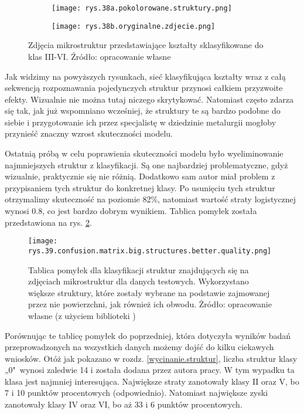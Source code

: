 \begin{figure}[h]
	\centering
	\begin{subfigure}{0.41\textwidth}
	    \centering
	    \texttt{[image: rys.38a.pokolorowane.struktury.png]}
	\end{subfigure}
	\begin{subfigure}{0.41\textwidth}
	    \centering
	    \texttt{[image: rys.38b.oryginalne.zdjecie.png]}
	\end{subfigure}
	\caption{\label{rys.38}Zdjęcia mikrostruktur przedstawiające kształty sklasyfikowane do klas III-VI. Źródło: opracowanie własne}
\end{figure}
\afterpage{\clearpage}Jak widzimy na powyższych rysunkach, sieć klasyfikująca kształty wraz z całą sekwencją rozpoznawania pojedynczych struktur przynosi całkiem przyzwoite efekty. Wizualnie nie można tutaj niczego skrytykować. Natomiast często zdarza się tak, jak już wspomniano wcześniej, że struktury te są bardzo podobne do siebie i przygotowanie ich przez specjalistę w dziedzinie metalurgii mogłoby przynieść znaczny wzrost skuteczności modelu.

Ostatnią próbą w celu poprawienia skuteczności modelu było wyeliminowanie najmniejszych struktur z klasyfikacji. Są one najbardziej problematyczne, gdyż wizualnie, praktycznie się nie różnią. Dodatkowo sam autor miał problem z przypisaniem tych struktur do konkretnej klasy. Po usunięciu tych struktur otrzymalimy skuteczność na poziomie 82\%, natomiast wartość straty logistycznej wynosi $0.8$, co jest bardzo dobrym wynikiem. Tablica pomyłek została przedstawiona na rys. \ref{rys.39.confusion.matrix.big.structures.png}. 
\begin{figure}[h]
    \centering
    \texttt{[image: rys.39.confusion.matrix.big.structures.better.quality.png]}  %
    \caption{Tablica pomyłek dla klasyfikacji struktur znajdujących się na zdjęciach mikrostruktur dla danych testowych. Wykorzystano większe struktury, które zostały wybrane na podstawie zajmowanej przez nie powierzchni, jak również ich obwodu. Żródło: opracowanie własne (z użyciem biblioteki )}
    \label{rys.39.confusion.matrix.big.structures.png}
\end{figure}
Porównując te tablicę pomyłek do poprzedniej, która dotyczyła wyników badań przeprowadzonych na wszystkich danych możemy dojść do kilku ciekawych wniosków. Otóż jak pokazano w rozdz. \ref{wycinanie.struktur}, liczba struktur klasy „0"~wynosi zaledwie 14 i została dodana przez autora pracy. W tym wypadku ta klasa jest najmniej interesująca. 
Największe straty zanotowały klasy II oraz V, bo 7 i 10 punktów procentowych (odpowiednio). Natomiast największe zyski zanotowały klasy IV oraz VI, bo aż 33 i 6 punktów procentowych.

